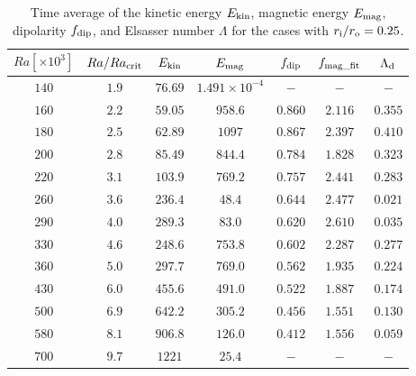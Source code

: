 \begin{table}
\caption{Time average of the kinetic energy $E_{\rm kin}$, magnetic energy $E_{\rm mag}$, dipolarity $f_{\rm dip}$, and Elsasser number $\Lambda$ for the cases with $r_{\rm i}/r_{\rm o} = 0.25$.}
  \begin{tabular}{ccccccc}
    \hline
     $Ra[\times 10^3]$  &  $Ra/Ra_{\rm crit}$&  $E_{\rm kin}$  &  $E_{\rm mag}$ & $f_{\rm dip}$ & $f_{\rm mag\_fit}$ & $\Lambda_{\rm d}$\\
    \hline 
    $140$  & $1.9$ &  $76.69$ & $1.491 \times 10^{-4}$ & $-$ & $-$ & $-$\\
    $160$  & $2.2$ &  $59.05$ & $958.6$ & $0.860$ & $2.116$ & $0.355$\\
    $180$  & $2.5$ &  $62.89$ & $1097$ & $0.867$ & $2.397$ & $0.410$\\
    $200$  & $2.8$ &  $85.49$ & $844.4$ & $0.784$ & $1.828$ & $0.323$\\
    $220$  & $3.1$ &  $103.9$ & $769.2$ & $0.757$ & $2.441$ & $0.283$\\
    $260$  & $3.6$ &  $236.4$ & $48.4$ & $0.644$ & $2.477$ & $0.021$\\
    $290$  & $4.0$ &  $289.3$ & $83.0$ & $0.620$ & $2.610$ & $0.035$\\
    $330$  & $4.6$ &  $248.6$ & $753.8$ & $0.602$ & $2.287$ & $0.277$\\
    $360$  & $5.0$ &  $297.7$ & $769.0$ & $0.562$ & $1.935$ & $0.224$\\
    $430$  & $6.0$ &  $455.6$ & $491.0$ & $0.522$ & $1.887$ & $0.174$\\
    $500$  & $6.9$ &  $642.2$ & $305.2$ & $0.456$ & $1.551$ & $0.130$\\
    $580$  & $8.1$ &  $906.8$ & $126.0$ & $0.412$ & $1.556$ & $0.059$\\
    $700$  & $9.7$ &  $1221$ & $25.4$ & $-$ & $-$ & $-$\\
    \hline
  \end{tabular}
 \label{table:Summary_25}
\end{table}
 
